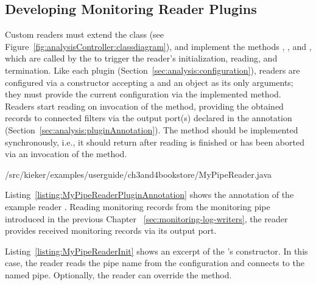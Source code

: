 \subsection{Developing Monitoring Reader Plugins}\label{sec:analysis:reader}

\noindent Custom readers must extend the class %
 (see Figure~\ref{fig:analysisController:classdiagram}), %
and implement the methods , , and , %
which are called by the  to trigger the reader's initialization, %
reading, and termination. Like each plugin (Section~\ref{sec:analysis:configuration}), %
readers are configured via a constructor accepting a  and an  object %
as its only arguments; they must provide the current configuration %
via the implemented  %
method. Readers start reading on invocation of the  method, %
providing the obtained records to connected filters via the output port(s) %
declared in the  annotation (Section~\ref{sec:analysis:pluginAnnotation}). %
The  method should be implemented synchronously, i.e., it should %
return after reading is finished or has been aborted via an invocation of the %
 method.

% 

\enlargethispage{1cm}

\setJavaCodeListing
%
{\customComponentsBookstoreApplicationDir/src/kieker/examples/userguide/ch3and4bookstore/MyPipeReader.java}

Listing~\ref{listing:MyPipeReaderPluginAnnotation} shows the  %
annotation  of the example reader . Reading monitoring %
records from the monitoring pipe introduced in the previous Chapter~%
\ref{sec:monitoring-log-writers}, the reader provides received monitoring %
records via its output port.

\noindent Listing~\ref{listing:MyPipeReaderInit} shows an excerpt of the 's %
constructor. In this case, the reader reads the pipe name from the %
configuration and connects to the named pipe. Optionally, the reader can override the 
 method.


